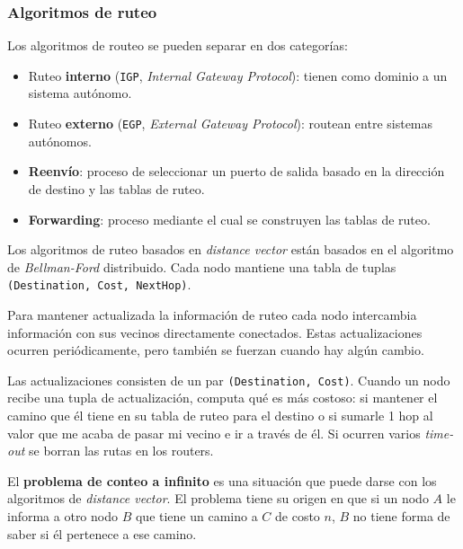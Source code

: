 \documentclass[]{article}
\begin{document}
\subsubsection{Algoritmos de ruteo}
Los algoritmos de routeo se pueden separar en dos categorías:
\begin{itemize}
    \item Ruteo \textbf{interno} (\texttt{IGP}, \emph{Internal Gateway Protocol}): tienen como dominio a un sistema autónomo.
    \item Ruteo \textbf{externo} (\texttt{EGP}, \emph{External Gateway Protocol}): routean entre sistemas autónomos.
\end{itemize}


\begin{itemize}
    \item \textbf{Reenvío}: proceso de seleccionar un puerto de salida basado en la dirección de destino y las tablas de ruteo.
    \item \textbf{Forwarding}: proceso mediante el cual se construyen las tablas de ruteo.
\end{itemize}


Los algoritmos de ruteo basados en \emph{distance vector} están basados en el algoritmo de \emph{Bellman-Ford} distribuido. Cada nodo mantiene una tabla de tuplas \texttt{(Destination, Cost, NextHop)}.

Para mantener actualizada la información de ruteo cada nodo intercambia información con sus vecinos directamente conectados. Estas actualizaciones ocurren periódicamente, pero también se fuerzan cuando hay algún cambio.

Las actualizaciones consisten de un par \texttt{(Destination, Cost)}. Cuando un nodo recibe una tupla de actualización, computa qué es más costoso: si mantener el camino que él tiene en su tabla de ruteo para el destino o si sumarle 1 hop al valor que me acaba de pasar mi vecino e ir a través de él. Si ocurren varios \emph{time-out} se borran las rutas en los routers.

El \textbf{problema de conteo a infinito} es una situación que puede darse con los algoritmos de \emph{distance vector}. El problema tiene su origen en que si un nodo $A$ le informa a otro nodo $B$ que tiene un camino a $C$ de costo $n$, $B$ no tiene forma de saber si él pertenece a ese camino.
\end{document}
